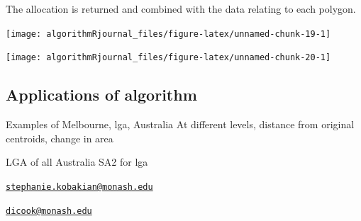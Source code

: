 The allocation is returned and combined with the data relating to each
polygon.

\begin{Schunk}

\texttt{[image: algorithmRjournal\_files/figure-latex/unnamed-chunk-19-1]} \end{Schunk}

\begin{Schunk}

\texttt{[image: algorithmRjournal\_files/figure-latex/unnamed-chunk-20-1]} \end{Schunk}

\hypertarget{applications-of-algorithm}{%
\subsection{Applications of algorithm}\label{applications-of-algorithm}}

Examples of Melbourne, lga, Australia At different levels, distance from
original centroids, change in area

LGA of all Australia SA2 for lga




\address{%
Stephanie Kobakian\\
Queensland Univeristy of Technology\\
\\
}
\href{mailto:stephanie.kobakian@monash.edu}{\nolinkurl{stephanie.kobakian@monash.edu}}

\address{%
Dianne Cook\\
Monash University\\
\\
}
\href{mailto:dicook@monash.edu}{\nolinkurl{dicook@monash.edu}}

